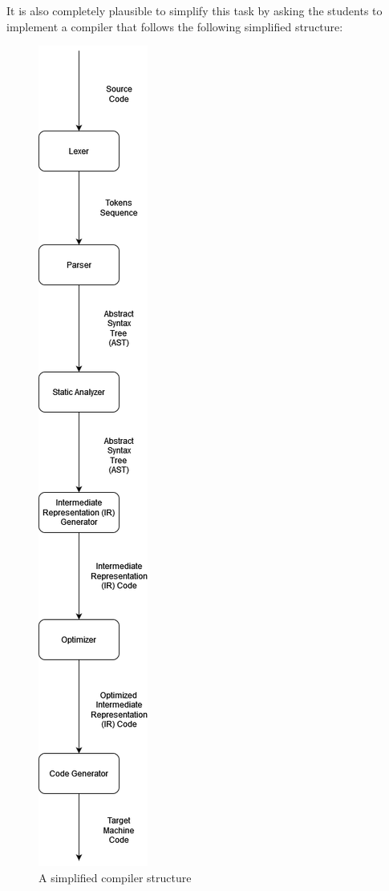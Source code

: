 \newpage

It is also completely plausible to simplify this task by asking the students to implement a compiler that follows the following simplified structure:

\begin{figure}[H]  
  \centering
  \includegraphics[width=\textwidth, height=0.8\textheight, keepaspectratio]{Figures/Arquiteturas/CompilersSimpliefiedPipeline.png}  
  \caption{A simplified compiler structure}
  \label{fig:Fluxograma}
\end{figure}
    
